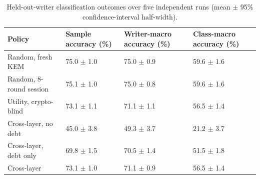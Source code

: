 \begin{table}[!ht]
\caption{Held-out-writer classification outcomes over five independent runs (mean $\pm$ 95\% confidence-interval half-width).}
\label{tab:quality}
\centering
\setlength{\tabcolsep}{2pt}
\begin{tabular}{|p{}|p{}|p{}|p{}|}
\hline
Policy & Sample accuracy (\%) & Writer-macro accuracy (\%) & Class-macro accuracy (\%) \\
\hline
Random, fresh KEM & 75.0 $\pm$ 1.0 & 75.0 $\pm$ 0.9 & 59.6 $\pm$ 1.6 \\
\hline
Random, 8-round session & 75.1 $\pm$ 1.0 & 75.0 $\pm$ 0.8 & 59.6 $\pm$ 1.6 \\
\hline
Utility, crypto-blind & 73.1 $\pm$ 1.1 & 71.1 $\pm$ 1.1 & 56.5 $\pm$ 1.4 \\
\hline
Cross-layer, no debt & 45.0 $\pm$ 3.8 & 49.3 $\pm$ 3.7 & 21.2 $\pm$ 3.7 \\
\hline
Cross-layer, debt only & 69.8 $\pm$ 1.5 & 70.5 $\pm$ 1.4 & 51.5 $\pm$ 1.8 \\
\hline
Cross-layer & 73.1 $\pm$ 1.0 & 71.1 $\pm$ 0.9 & 56.5 $\pm$ 1.4 \\
\hline
\end{tabular}
\end{table}
